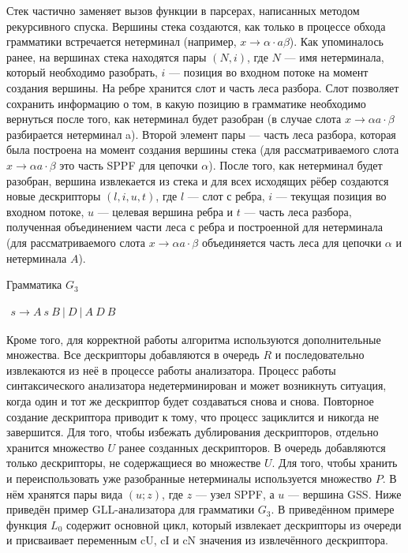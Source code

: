 Стек частично заменяет вызов функции в парсерах, написанных методом рекурсивного спуска. Вершины стека создаются, как только в процессе обхода грамматики встречается нетерминал (например, $x \rightarrow \alpha \cdot a \beta$). Как упоминалось ранее, на вершинах стека находятся пары $(N, i)$, где $N$ --- имя нетерминала, который необходимо разобрать, $i$ --- позиция во входном потоке на момент создания вершины. На ребре хранится слот и часть леса разбора. Слот позволяет сохранить информацию о том, в какую позицию в грамматике необходимо вернуться после того, как нетерминал будет разобран (в случае слота $x \rightarrow \alpha a \cdot \beta$ разбирается нетерминал a). Второй элемент пары --- часть леса разбора, которая была построена на момент создания вершины стека (для рассматриваемого слота $x \rightarrow \alpha a \cdot \beta$ это часть SPPF для цепочки $\alpha$). После того, как нетерминал будет разобран, вершина извлекается из стека и для всех исходящих рёбер создаются новые дескрипторы $(l, i, u, t)$, где $l$ --- слот с ребра, $i$ --- текущая позиция во входном потоке, $u$ --- целевая вершина ребра и $t$ --- часть леса разбора, полученная объединением части леса с ребра и построенной для нетерминала (для рассматриваемого слота $x \rightarrow \alpha a \cdot \beta$ объединяется часть леса для цепочки $\alpha$ и нетерминала $A$).

\begin{listing}
\caption{Грамматика $G_3$}
\label{grmG3}
\centering
$\begin{array}{rl}
s \rightarrow A \ s \ B \ | \ D \ | \ A \ D \ B 
\end{array}$
\end{listing}

Кроме того, для корректной работы алгоритма используются дополнительные множества. Все дескрипторы добавляются в очередь $R$ и последовательно извлекаются из неё в процессе работы анализатора. Процесс работы синтаксического анализатора недетерминирован и может возникнуть ситуация, когда один и тот же дескриптор будет создаваться снова и снова. Повторное создание дескриптора приводит к тому, что процесс зациклится и никогда не завершится. Для того, чтобы избежать дублирования дескрипторов, отдельно хранится множество $U$ ранее созданных дескрипторов. В очередь добавляются только дескрипторы, не содержащиеся во множестве $U$. Для того, чтобы хранить и переиспользовать уже разобранные нетерминалы используется множество $P$. В нём хранятся пары вида $(u; z)$, где $z$ --- узел SPPF, а $u$ --- вершина GSS. Ниже приведён пример GLL-анализатора для грамматики $G_3$. В приведённом примере функция $L_0$ содержит основной цикл, который извлекает дескрипторы из очереди и присваивает переменным cU, cI  и cN значения из извлечённого дескриптора. 

